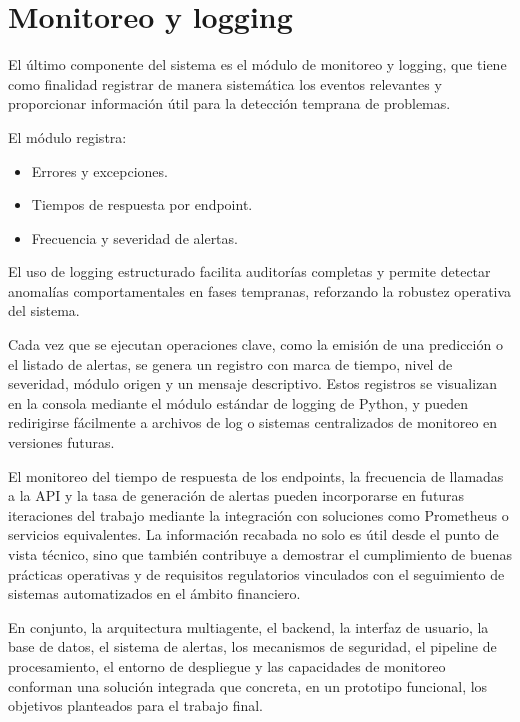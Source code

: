 \section{Monitoreo y logging}

 El último componente del sistema es el módulo de monitoreo y logging, que tiene
  como finalidad registrar de manera sistemática los eventos relevantes y
  proporcionar información útil para la detección temprana de problemas.

  El módulo registra:

  \begin{itemize}
      \item Errores y excepciones.
      \item Tiempos de respuesta por endpoint.
      \item Frecuencia y severidad de alertas.
  \end{itemize}

  El uso de logging estructurado facilita auditorías completas y permite detectar
  anomalías comportamentales en fases tempranas, reforzando la robustez operativa
  del sistema.

  Cada vez que se ejecutan operaciones clave, como la emisión de una predicción o
  el listado de alertas, se genera un registro con marca de tiempo, nivel de
  severidad, módulo origen y un mensaje descriptivo. Estos registros se visualizan
  en la consola mediante el módulo estándar de logging de Python, y pueden
  redirigirse fácilmente a archivos de log o sistemas centralizados de monitoreo
  en versiones futuras.

El monitoreo del tiempo de respuesta de los endpoints, la frecuencia de llamadas a la API y la tasa de generación de alertas pueden incorporarse en futuras iteraciones del trabajo mediante la integración con soluciones como Prometheus o servicios equivalentes. La información recabada no solo es útil desde el punto de vista técnico, sino que también contribuye a demostrar el cumplimiento de buenas prácticas operativas y de requisitos regulatorios vinculados con el seguimiento de sistemas automatizados en el ámbito financiero.

En conjunto, la arquitectura multiagente, el backend, la interfaz de usuario, la base de datos, el sistema de alertas, los mecanismos de seguridad, el pipeline de procesamiento, el entorno de despliegue y las capacidades de monitoreo conforman una solución integrada que concreta, en un prototipo funcional, los objetivos planteados para el trabajo final.


